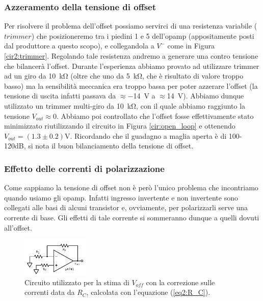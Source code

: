 \subsubsection{Azzeramento della tensione di offset}

Per risolvere il problema dell'offset possiamo servirci di una resistenza variabile ($trimmer$) che posizioneremo tra i piedini 1 e 5 dell'opamp (appositamente posti dal produttore a questo scopo), e collegandola a $V^-$ come in Figura \ref{cir2:trimmer}. Regolando tale resistenza andremo a generare una contro tensione che bilancerà l'offset. Durante l'esperienza abbiamo provato ad utilizzare trimmer ad un giro da \SI{10}{\kilo\ohm} (oltre che uno da \SI{5}{\kilo\ohm}, che è risultato di valore troppo basso) ma la sensibilità meccanica era troppo bassa per poter azzerare l'offset (la tensione di uscita infatti passava da $\approx$\SI{-14}{\volt} a $\approx$\SI{+14}{\volt}). Abbiamo dunque utilizzato un trimmer multi-giro da \SI{10}{\kilo\ohm}, con il quale abbiamo raggiunto la tensione $V_{out}\approx 0$. Abbiamo poi controllato che l'offset fosse effettivamente stato minimizzato riutilizzando il circuito in Figura \ref{cir:open_loop} e ottenendo $V_{out}= (1.3\pm0.2)\si{\volt}$. Ricordando che il guadagno a maglia aperta è di 100-120dB, si nota il buon bilanciamento della tensione di offset.

\subsubsection{Effetto delle correnti di polarizzazione}

Come sappiamo la tensione di offset non è però l'unico problema che incontriamo quando usiamo gli opamp. Infatti ingresso invertente e non invertente sono collegati alle basi di alcuni transistor e, ovviamente, per polarizzarli serve una corrente di base. Gli effetti di tale corrente si sommeranno dunque a quelli dovuti all'offset.

\begin{figure}
  \begin{center}
    \includegraphics[width=0.280\textwidth]{../E02/latex/current_correction.pdf}
  \end{center}
  \caption{Circuito utilizzato per la stima di $V_{off}$ con la correzione sulle correnti data da $R_C$, calcolata con l'equazione (\ref{eq2:R_C}).}
  \label{cir2:current_correction}
\end{figure}

